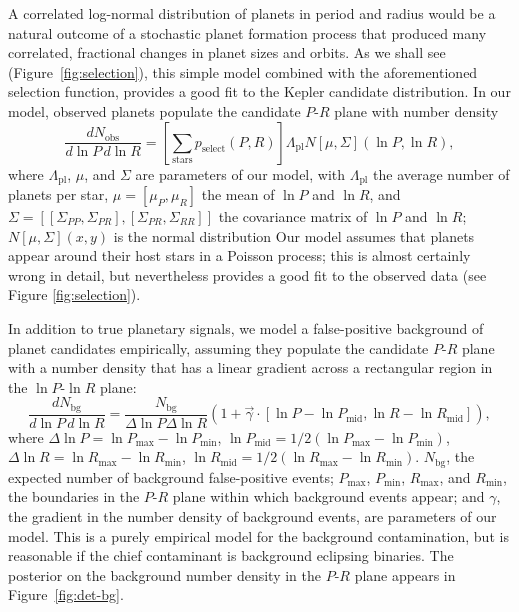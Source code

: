 \documentclass[12pt]{article}
\newcommand{\Rpl}{\Lambda_\mathrm{pl}}
\newcommand{\Nbg}{N_\mathrm{bg}}
\begin{document}
A correlated log-normal distribution of planets in period and radius
would be a natural outcome of a stochastic planet formation process
that produced many correlated, fractional changes in planet sizes and
orbits.  As we shall see (Figure\ \ref{fig:selection}), this simple
model combined with the aforementioned selection function, provides a
good fit to the Kepler candidate distribution.  In our model, observed
planets populate the candidate $P$-$R$ plane with number density
\begin{equation}
  \label{eq:foreground-rate}
  \frac{dN_\mathrm{obs}}{d\ln P\, d\ln R} = \left[ \sum_\mathrm{stars}
    p_\mathrm{select}(P, R) \right] \Rpl N\left[ \mu, \Sigma
    \right]\left( \ln P, \ln R \right),
\end{equation}
where $\Rpl$, $\mu$, and $\Sigma$ are parameters of our model, with
$\Rpl$ the average number of planets per star, $\mu = \left[ \mu_P,
  \mu_R \right]$ the mean of $\ln P$ and $\ln R$, and $\Sigma = \left[
  \left[ \Sigma_{PP}, \Sigma_{PR} \right], \left[ \Sigma_{PR},
    \Sigma_{RR} \right]\right]$ the covariance matrix of $\ln P$ and
$\ln R$; $N\left[ \mu, \Sigma \right](x,y)$ is the normal distribution
Our model assumes that planets appear around their host stars in a
Poisson process; this is almost certainly wrong in
detail\cite{Weissbein2012}, but nevertheless provides a good fit to
the observed data (see Figure \ref{fig:selection}).

In addition to true planetary signals, we model a false-positive
background of planet candidates empirically, assuming they populate
the candidate $P$-$R$ plane with a number density that has a linear
gradient across a rectangular region in the $\ln P$-$\ln R$ plane:
\begin{equation}
  \label{eq:background-rate}
  \frac{d\Nbg}{d \ln P \, d \ln R} = \frac{\Nbg}{\Delta \ln P \Delta
    \ln R} \left( 1 + \vec{\gamma} \cdot \left[ \ln P - \ln P_\mathrm{mid} , \ln
    R - \ln R_\mathrm{mid} \right] \right),
\end{equation}
where $\Delta \ln P = \ln P_\mathrm{max} - \ln P_\mathrm{min}$, $\ln
P_\mathrm{mid} = 1/2\left(\ln P_\mathrm{max} - \ln P_\mathrm{min}
\right)$, $\Delta \ln R = \ln R_\mathrm{max} - \ln R_\mathrm{min}$,
$\ln R_\mathrm{mid} = 1/2\left(\ln R_\mathrm{max} - \ln R_\mathrm{min}
\right)$.  $\Nbg$, the expected number of background false-positive
events; $P_\mathrm{max}$, $P_\mathrm{min}$, $R_\mathrm{max}$, and
$R_\mathrm{min}$, the boundaries in the $P$-$R$ plane within which
background events appear; and $\gamma$, the gradient in the number
density of background events, are parameters of our model.  This is a
purely empirical model for the background contamination, but is
reasonable if the chief contaminant is background eclipsing
binaries\cite{Fressin2013,Duquennoy1991}.  The posterior on the
background number density in the $P$-$R$ plane appears in
Figure\ \ref{fig:det-bg}.
\end{document}
